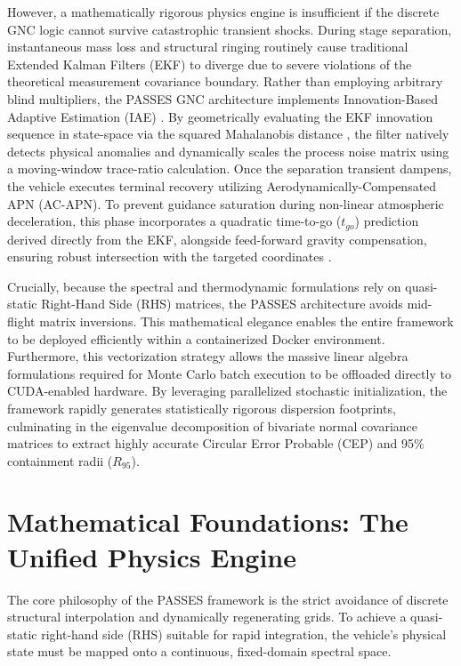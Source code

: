 \documentclass[11pt,a4paper]{article}
\theoremstyle{definition}
\numberwithin{equation}{section}
\begin{document}
However, a mathematically rigorous physics engine is insufficient if the discrete GNC logic cannot survive catastrophic transient shocks. During stage separation, instantaneous mass loss and structural ringing routinely cause traditional Extended Kalman Filters (EKF) to diverge due to severe violations of the theoretical measurement covariance boundary. Rather than employing arbitrary blind multipliers, the PASSES GNC architecture implements Innovation-Based Adaptive Estimation (IAE) \cite{mehra1970}. By geometrically evaluating the EKF innovation sequence in state-space via the squared Mahalanobis distance \cite{barshalom2001}, the filter natively detects physical anomalies and dynamically scales the process noise matrix using a moving-window trace-ratio calculation. Once the separation transient dampens, the vehicle executes terminal recovery utilizing Aerodynamically-Compensated APN (AC-APN). To prevent guidance saturation during non-linear atmospheric deceleration, this phase incorporates a quadratic time-to-go ($t_{go}$) prediction derived directly from the EKF, alongside feed-forward gravity compensation, ensuring robust intersection with the targeted coordinates \cite{zarchan2012}.

Crucially, because the spectral and thermodynamic formulations rely on quasi-static Right-Hand Side (RHS) matrices, the PASSES architecture avoids mid-flight matrix inversions. This mathematical elegance enables the entire framework to be deployed efficiently within a containerized Docker environment. Furthermore, this vectorization strategy allows the massive linear algebra formulations required for Monte Carlo batch execution to be offloaded directly to CUDA-enabled hardware. By leveraging parallelized stochastic initialization, the framework rapidly generates statistically rigorous dispersion footprints, culminating in the eigenvalue decomposition of bivariate normal covariance matrices to extract highly accurate Circular Error Probable (CEP) and 95\% containment radii ($R_{95}$).

\section{Mathematical Foundations: The Unified Physics Engine}
\label{sec:physics}

The core philosophy of the PASSES framework is the strict avoidance of discrete structural interpolation and dynamically regenerating grids. To achieve a quasi-static right-hand side (RHS) suitable for rapid integration, the vehicle’s physical state must be mapped onto a continuous, fixed-domain spectral space. 
\end{document}
